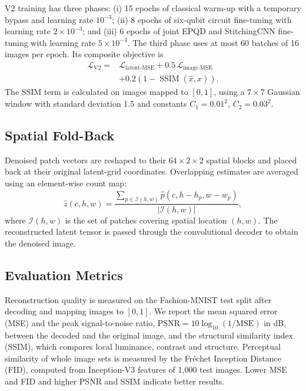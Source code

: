 V2 training has three phases: (i) 15 epochs of classical warm-up with a temporary bypass and learning rate $10^{-3}$; (ii) 8 epochs of six-qubit circuit fine-tuning with learning rate $2\times10^{-3}$; and (iii) 6 epochs of joint EPQD and StitchingCNN fine-tuning with learning rate $5\times10^{-4}$. The third phase uses at most 60 batches of 16 images per epoch. Its composite objective is
\begin{equation}
\begin{split}
\mathcal{L}_{\mathrm{V2}}={}&
\mathcal{L}_{\mathrm{latent\text{-}MSE}}
+0.5\,\mathcal{L}_{\mathrm{image\text{-}MSE}}\\
&+0.2\left(1-\operatorname{SSIM}(\hat x,x)\right).
\end{split}
\end{equation}
The SSIM term is calculated on images mapped to $[0,1]$, using a $7\times7$ Gaussian window with standard deviation 1.5 and constants $C_1=0.01^2$, $C_2=0.03^2$.

\subsection{Spatial Fold-Back}
Denoised patch vectors are reshaped to their $64\times2\times2$ spatial blocks and placed back at their original latent-grid coordinates. Overlapping estimates are averaged using an element-wise count map:
\begin{equation}
    \hat z(c,h,w)=
    \frac{\sum_{p\in\mathcal{I}(h,w)}\hat p(c,h-h_p,w-w_p)}
         {|\mathcal{I}(h,w)|},
\end{equation}
where $\mathcal{I}(h,w)$ is the set of patches covering spatial location $(h,w)$. The reconstructed latent tensor is passed through the convolutional decoder to obtain the denoised image.

\subsection{Evaluation Metrics}
Reconstruction quality is measured on the Fashion-MNIST test split after decoding and mapping images to $[0,1]$. We report the mean squared error (MSE) and the peak signal-to-noise ratio, $\mathrm{PSNR}=10\log_{10}(1/\mathrm{MSE})$ in dB, between the decoded and the original image, and the structural similarity index (SSIM), which compares local luminance, contrast and structure. Perceptual similarity of whole image sets is measured by the Fr\'echet Inception Distance (FID), computed from Inception-V3 features of 1{,}000 test images. Lower MSE and FID and higher PSNR and SSIM indicate better results.

